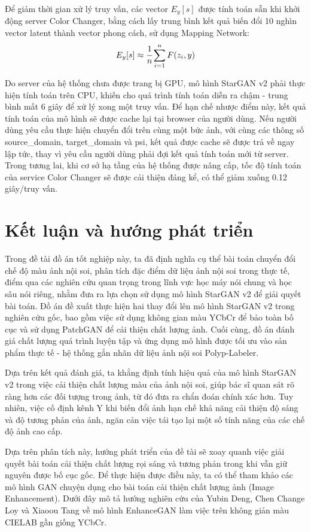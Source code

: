 \documentclass[12pt]{extreport}
\begin{document}
Để giảm thời gian xử lý truy vấn, các vector $ E_y [s] $ được tính toán sẵn khi khởi động server Color Changer, bằng cách lấy trung bình kết quả biến đổi 10 nghìn vector latent thành vector phong cách, sử dụng Mapping Network:
$$ E_y[s] \approx \cfrac{1}{n} \sum_{i = 1}^{n} F(z_{i}, y) $$

Do server của hệ thống chưa được trang bị GPU, mô hình StarGAN v2 phải thực hiện tính toán trên CPU, khiến cho quá trình tính toán diễn ra chậm - trung bình mất 6 giây để xử lý xong một truy vấn. Để hạn chế nhược điểm này, kết quả tính toán của mô hình sẽ được cache lại tại browser của người dùng. Nếu người dùng yêu cầu thực hiện chuyển đổi trên cùng một bức ảnh, với cùng các thông số source\_domain, target\_domain và psi, kết quả được cache sẽ được trả về ngay lập tức, thay vì yêu cầu người dùng phải đợi kết quả tính toán mới từ server. Trong tương lai, khi cơ sở hạ tầng của hệ thống được nâng cấp, tốc độ tính toán của service Color Changer sẽ được cải thiện đáng kể, có thể giảm xuống 0.12 giây/truy vấn.

\chapter{Kết luận và hướng phát triển}

Trong đề tài đồ án tốt nghiệp này, ta đã định nghĩa cụ thể bài toán chuyển đổi chế độ màu ảnh nội soi, phân tích đặc điểm dữ liệu ảnh nội soi trong thực tế, điểm qua các nghiên cứu quan trọng trong lĩnh vực học máy nói chung và học sâu nói riêng, nhằm đưa ra lựa chọn sử dụng mô hình StarGAN v2 để giải quyết bài toán. Đồ án đề xuất thực hiện hai thay đổi lên mô hình StarGAN v2 trong nghiên cứu gốc, bao gồm việc sử dụng không gian màu YCbCr để bảo toàn bố cục và sử dụng PatchGAN để cải thiện chất lượng ảnh. Cuối cùng, đồ án đánh giá chất lượng quá trình luyện tập và ứng dụng mô hình được tối ưu vào sản phẩm thực tế - hệ thống gắn nhãn dữ liệu ảnh nội soi Polyp-Labeler.

Dựa trên kết quả đánh giá, ta khẳng định tính hiệu quả của mô hình StarGAN v2 trong việc cải thiện chất lượng màu của ảnh nội soi, giúp bác sĩ quan sát rõ ràng hơn các đối tượng trong ảnh, từ đó đưa ra chẩn đoán chính xác hơn. Tuy nhiên, việc cố định kênh Y khi biến đổi ảnh hạn chế khả năng cải thiện độ sáng và độ tương phản của ảnh, ngăn cản việc tái tạo lại một số tính năng của các chế độ ảnh cao cấp.

Dựa trên phân tích này, hướng phát triển của đề tài sẽ xoay quanh việc giải quyết bài toán cải thiện chất lượng rọi sáng và tương phản trong khi vẫn giữ nguyên được bố cục gốc. Để thực hiện được điều này, ta có thể tham khảo các mô hình GAN chuyện dụng cho bài toán cải thiện chất lượng ảnh (Image Enhancement). Dưới đây mô tả hướng nghiên cứu của Yubin Deng, Chen Change Loy và Xiaoou Tang về mô hình EnhanceGAN \cite{DBLP:journals/corr/DengLT17} làm việc trên không giản màu CIELAB gần giống YCbCr.
\end{document}
